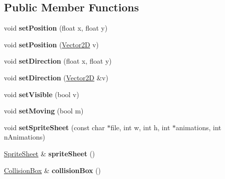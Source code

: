 \subsection*{Public Member Functions}
\begin{DoxyCompactItemize}
\item 
\hypertarget{class_entity_a93306ecdce9446da37560f5f2b5307c0}{void {\bfseries set\-Position} (float x, float y)}\label{class_entity_a93306ecdce9446da37560f5f2b5307c0}

\item 
\hypertarget{class_entity_a4a3db66e94bc72170bcda8b12c8459e5}{void {\bfseries set\-Position} (\hyperlink{class_vector2_d}{Vector2\-D} v)}\label{class_entity_a4a3db66e94bc72170bcda8b12c8459e5}

\item 
\hypertarget{class_entity_a9e3c0cf949f611403d3166554a47031d}{void {\bfseries set\-Direction} (float x, float y)}\label{class_entity_a9e3c0cf949f611403d3166554a47031d}

\item 
\hypertarget{class_entity_a881f23d8c1d5eed41935540af9a84222}{void {\bfseries set\-Direction} (\hyperlink{class_vector2_d}{Vector2\-D} \&v)}\label{class_entity_a881f23d8c1d5eed41935540af9a84222}

\item 
\hypertarget{class_entity_a10c4181924679903a918174e7772abf9}{void {\bfseries set\-Visible} (bool v)}\label{class_entity_a10c4181924679903a918174e7772abf9}

\item 
\hypertarget{class_entity_af0dc11f1a253b5c7c1bb07e76f8bc261}{void {\bfseries set\-Moving} (bool m)}\label{class_entity_af0dc11f1a253b5c7c1bb07e76f8bc261}

\item 
\hypertarget{class_entity_ae405331a64288b8fb4bfe05c66d58ace}{void {\bfseries set\-Sprite\-Sheet} (const char $\ast$file, int w, int h, int $\ast$animations, int n\-Animations)}\label{class_entity_ae405331a64288b8fb4bfe05c66d58ace}

\item 
\hypertarget{class_entity_ae83091bf9d06a5257cf3f571470383e5}{\hyperlink{class_sprite_sheet}{Sprite\-Sheet} \& {\bfseries sprite\-Sheet} ()}\label{class_entity_ae83091bf9d06a5257cf3f571470383e5}

\item 
\hypertarget{class_entity_a9f0c2c230382d8f4f19f6da86beb6384}{\hyperlink{class_collision_box}{Collision\-Box} \& {\bfseries collision\-Box} ()}\label{class_entity_a9f0c2c230382d8f4f19f6da86beb6384}


\end{DoxyCompactItemize}
